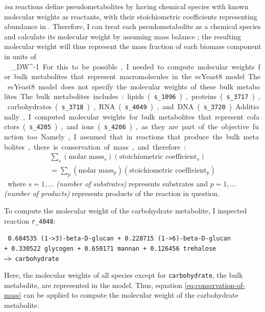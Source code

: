 \textit{isa} reactions define pseudometabolites by having chemical species with known molecular weights as reactants, with their stoichiometric coefficients representing abundance in \SI{}{\mmolgdw}.
Therefore, I can treat each pseudometabolite as a chemical species and calculate its molecular weight by assuming mass balance \parencite{chanStandardizingBiomassReactions2017, dinhQuantifyingPropagationParametric2022, takhaveevTemporalSegregationBiosynthetic2023};
the resulting molecular weight will thus represent the mass fraction of each biomass component in units of \SI{}{\gram~\gram_{DW}^{-1}}.

For this to be possible, I needed to compute molecular weights for bulk metabolites that represent macromolecules in the ecYeast8 model.
The ecYeast8 model does not specify the molecular weights of these bulk metabolites.
The bulk metabolites includes: lipids (\texttt{s\_1096}), proteins (\texttt{s\_3717}), carbohydrates (\texttt{s\_3718}), RNA (\texttt{s\_4049}), and DNA (\texttt{s\_3720}).
Additionally, I computed molecular weights for bulk metabolites that represent cofactors (\texttt{s\_4205}), and ions (\texttt{s\_4206}), as they are part of the objective function too.
Namely, I assumed that in reactions that produce the bulk metabolites, there is conservation of mass, and therefore:

\begin{equation}
\label{eq:conservation-of-mass}
  \begin{aligned}
    \sum_{s}(\text{molar mass}_{s})(\text{stoichiometric coefficient}_{s}) \\ = \sum_{p}(\text{molar mass}_{p})(\text{stoichiometric coefficient}_{p})
  \end{aligned}
\end{equation}

where $s = 1, ...$ \emph{(number of substrates)} represents substrates and $p = 1, ...$ \emph{(number of products)} represents products of the reaction in question.

To compute the molecular weight of the carbohydrate metabolite, I inspected reaction \texttt{r\_4048}:

\texttt{
  0.684535 (1->3)-beta-D-glucan + 0.228715 (1->6)-beta-D-glucan \\
  + 0.330522 glycogen + 0.650171 mannan + 0.126456 trehalose \\
  --> carbohydrate
}

Here, the molecular weights of all species except for \texttt{carbohydrate}, the bulk metabolite, are represented in the model.
Thus, equation \ref{eq:conservation-of-mass} can be applied to compute the molecular weight of the carbohydrate metabolite.


